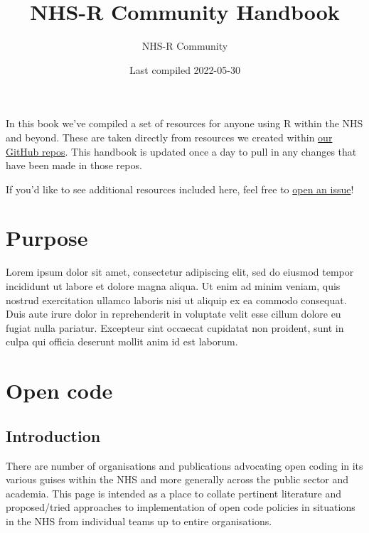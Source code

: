 \documentclass[
]{book}
\title{NHS-R Community Handbook}
\author{NHS-R Community}
\date{Last compiled 2022-05-30}
\begin{document}
\maketitle

{
\setcounter{tocdepth}{1}
\tableofcontents
}
\hypertarget{section}{%
\chapter*{}\label{section}}

In this book we've compiled a set of resources for anyone using R within the NHS and beyond. These are taken directly from resources we created within \href{https://github.com/nhs-r-community}{our GitHub repos}. This handbook is updated once a day to pull in any changes that have been made in those repos.

If you'd like to see additional resources included here, feel free to \href{https://github.com/nhs-r-community/statements-on-tools/issues/}{open an issue}!

\newpage

\hypertarget{purpose}{%
\chapter{Purpose}\label{purpose}}

Lorem ipsum dolor sit amet, consectetur adipiscing elit, sed do eiusmod tempor incididunt ut labore et dolore magna aliqua. Ut enim ad minim veniam, quis nostrud exercitation ullamco laboris nisi ut aliquip ex ea commodo consequat. Duis aute irure dolor in reprehenderit in voluptate velit esse cillum dolore eu fugiat nulla pariatur. Excepteur sint occaecat cupidatat non proident, sunt in culpa qui officia deserunt mollit anim id est laborum.

\newpage

\hypertarget{open-code}{%
\chapter{Open code}\label{open-code}}

\hypertarget{introduction}{%
\section{Introduction}\label{introduction}}

There are number of organisations and publications advocating open coding in its various guises within the NHS and more generally across the public sector and academia. This page is intended as a place to collate pertinent literature and proposed/tried approaches to implementation of open code policies in situations in the NHS from individual teams up to entire organisations.
\end{document}
